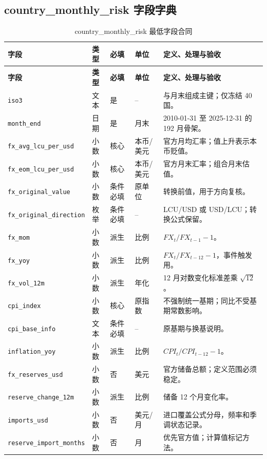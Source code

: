 \documentclass[UTF8,fontset=windows,12pt,openany]{ctexbook}
\newcommand{\Field}[1]{{\small\nolinkurl{#1}}}
\begin{document}
\clearpage
\begin{landscape}
\chapter{country\_monthly\_risk 字段字典}
\begin{longtable}{p{4.0cm}p{2.3cm}p{2.3cm}p{2.7cm}p{7.2cm}}
\caption{country\_monthly\_risk 最低字段合同}\label{tab:dict-monthly}\\
\toprule
\textbf{字段} & \textbf{类型} & \textbf{必填} & \textbf{单位} & \textbf{定义、处理与验收}\\
\midrule
\endfirsthead
\toprule \textbf{字段} & \textbf{类型} & \textbf{必填} & \textbf{单位} & \textbf{定义、处理与验收}\\ \midrule
\endhead
\Field{iso3} & 文本 & 是 & -- & 与月末组成主键；仅冻结 40 国。\\
\Field{month_end} & 日期 & 是 & 月末 & 2010-01-31 至 2025-12-31 的 192 月骨架。\\
\Field{fx_avg_lcu_per_usd} & 小数 & 核心 & 本币/美元 & 官方月均汇率；值上升表示本币贬值。\\
\Field{fx_eom_lcu_per_usd} & 小数 & 核心 & 本币/美元 & 官方月末汇率；组合月末估值。\\
\Field{fx_original_value} & 小数 & 条件必填 & 原单位 & 转换前值，用于方向复核。\\
\Field{fx_original_direction} & 枚举 & 条件必填 & -- & LCU/USD 或 USD/LCU；转换公式保留。\\
\Field{fx_mom} & 小数 & 派生 & 比例 & \(FX_t/FX_{t-1}-1\)。\\
\Field{fx_yoy} & 小数 & 派生 & 比例 & \(FX_t/FX_{t-12}-1\)，事件触发用。\\
\Field{fx_vol_12m} & 小数 & 派生 & 年化 & 12 月对数变化标准差乘 \(\sqrt{12}\)。\\
\Field{cpi_index} & 小数 & 核心 & 原指数 & 不强制统一基期；同比不受基期常数影响。\\
\Field{cpi_base_info} & 文本 & 条件必填 & -- & 原基期与换基说明。\\
\Field{inflation_yoy} & 小数 & 派生 & 比例 & \(CPI_t/CPI_{t-12}-1\)。\\
\Field{fx_reserves_usd} & 小数 & 否 & 美元 & 官方储备总额；定义范围必须稳定。\\
\Field{reserve_change_12m} & 小数 & 派生 & 比例 & 储备 12 个月变化率。\\
\Field{imports_usd} & 小数 & 否 & 美元/月 & 进口覆盖公式分母，频率和季调状态记录。\\
\Field{reserve_import_months} & 小数 & 否 & 月 & 优先官方值；计算值标记方法。\\

\end{longtable}
\end{landscape}
\end{document}
